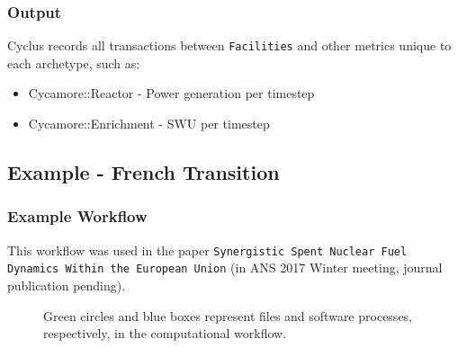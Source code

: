 \begin{frame}
    \frametitle{Output}
    Cyclus records all transactions between \texttt{Facilities}
    and other metrics unique to each archetype, such as:
    \begin{itemize}
        \item Cycamore::Reactor - Power generation per timestep
        \item Cycamore::Enrichment - SWU per timestep
    \end{itemize}
\end{frame}


\subsection{Example - French Transition}
\begin{frame}
    \frametitle{Example Workflow}
    This workflow was used in the paper \texttt{Synergistic Spent Nuclear Fuel Dynamics Within the European Union} (in ANS 2017 Winter meeting, journal publication pending).

\begin{figure}
\caption{Green circles and blue boxes represent files and software 
processes, respectively, in the computational workflow.}
\label{diag:comp}
\end{figure}

\end{frame}

